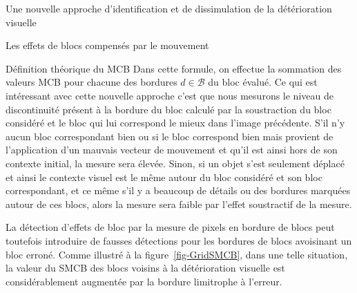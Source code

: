 \documentclass[letterpaper, twoside, 12pt,memoire]{thETS}
\newcommand{\SC}[1]{%
	{
	\todo[inline,color={red!100!green!33!}]{%
	\textbf{[SC]:}~#1}
	}}
\newcommand{\fig}[1]{figure~\ref{#1}}
\providecommand{\DIFaddbegin}{} %
\providecommand{\DIFaddend}{} %
\begin{document}
\begin{chapter}{Une nouvelle approche d'identification et de dissimulation de la
détérioration visuelle}
\begin{section}{Les effets de blocs compensés par le mouvement}
\begin{subsection}{Définition théorique du MCB}
Dans cette formule, on effectue la sommation des valeurs MCB pour chacune des
bordures $d \in \mathcal{B}$ du bloc évalué. Ce qui est intéressant avec cette nouvelle approche c'est que nous mesurons le niveau de discontinuité présent à la bordure du bloc calculé par la soustraction du bloc considéré et le bloc qui lui correspond le mieux dans l'image précédente. S'il n'y aucun bloc correspondant bien ou si le bloc correspond bien mais provient de l'application d'un mauvais vecteur de mouvement et qu'il est ainsi hors de son contexte initial, la mesure sera élevée. Sinon, si un objet s'est seulement déplacé et ainsi le contexte visuel est le même autour du bloc considéré et son bloc correspondant, et ce même s'il y a beaucoup de détails ou des bordures marquées autour de ces blocs, alors la mesure sera faible par l'effet soustractif de la mesure.\DIFaddbegin \SC{une figure pour illustrée ces cas?}
\DIFaddend 

La détection d'effets de bloc par la mesure de pixels en bordure de blocs peut toutefois
introduire de fausses détections pour les bordures de blocs avoisinant un bloc
erroné. Comme illustré à la \fig{fig-GridSMCB}, dans une telle situation, la
valeur du SMCB des blocs voisins à la détérioration visuelle est
considérablement augmentée par la bordure limitrophe à l'erreur.


\end{subsection}
\end{section}
\end{chapter}
\end{document}
